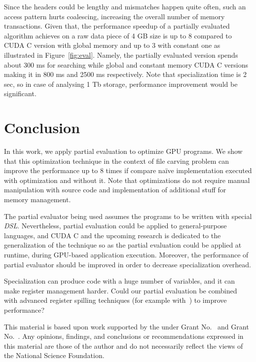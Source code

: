 \documentclass[sigplan]{acmart}\settopmatter{printacmref=false, printfolios=false}
\begin{document}
Since the headers could be lengthy and mismatches happen quite often, such an access pattern hurts coalescing, increasing the overall number of memory transactions.
Given that, the performance speedup of a partially evaluated algorithm achieves on a raw data piece of 4 GB size is up to $8$ compared to CUDA C version with global memory and up to $3$ with constant one as illustrated in Figure~\ref{fig:eval}. Namely, the partially evaluated version spends about 300 ms for searching while global and constant memory CUDA C versions making it in 800 ms and 2500 ms respectively.
Note that specialization time is 2 sec, so in case of analysing 1 Tb storage, performance improvement would be significant.


\section{Conclusion}
In this work, we apply partial evaluation to optimize GPU programs.
We show that this optimization technique in the context of file carving problem can improve the performance up to $8$ times if compare na\"ive implementation executed with optimization and without it.
Note that optimizations do not require manual manipulation with source code and implementation of additional stuff for memory management.

The partial evaluator being used assumes the programs to be written with special \textit{DSL}.
Nevertheless, partial evaluation could be applied to general-purpose languages, and CUDA C and the upcoming research is dedicated to the generalization of the technique so as the partial evaluation could be applied at runtime, during GPU-based application execution.
Moreover, the performance of partial evaluator should be improved in order to decrease specialization overhead.

Specialization can produce code with a huge number of variables, and it can make register management harder.
Could our partial evaluation be combined with advanced register spilling techniques (for example with~\cite{Sakdhnagool2019RegDemIG}) to improve performance?

\begin{acks}                            %
  This material is based upon work supported by the
   under Grant
  No.~ and Grant
  No.~.  Any opinions, findings, and
  conclusions or recommendations expressed in this material are those
  of the author and do not necessarily reflect the views of the
  National Science Foundation.
\end{acks}






\end{document}
